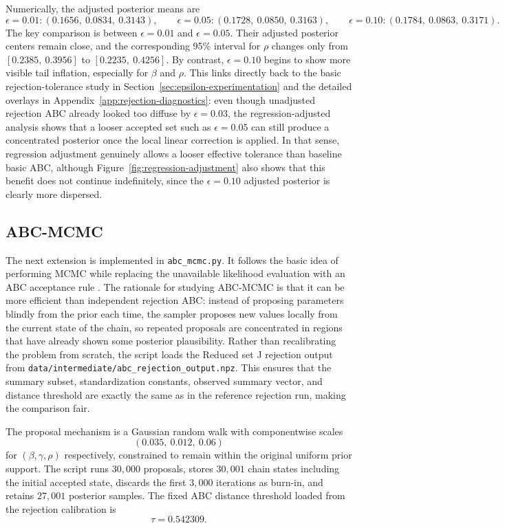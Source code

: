 \documentclass[11pt]{article}
\begin{document}
Numerically, the adjusted posterior means are
\[
\epsilon=0.01: (0.1656,\ 0.0834,\ 0.3143), \qquad
\epsilon=0.05: (0.1728,\ 0.0850,\ 0.3163), \qquad
\epsilon=0.10: (0.1784,\ 0.0863,\ 0.3171).
\]
The key comparison is between $\epsilon=0.01$ and $\epsilon=0.05$. Their adjusted posterior centers remain close, and the corresponding 95\% interval for $\rho$ changes only from $[0.2385,\ 0.3956]$ to $[0.2235,\ 0.4256]$. By contrast, $\epsilon=0.10$ begins to show more visible tail inflation, especially for $\beta$ and $\rho$. This links directly back to the basic rejection-tolerance study in Section~\ref{sec:epsilon-experimentation} and the detailed overlays in Appendix~\ref{app:rejection-diagnostics}: even though unadjusted rejection ABC already looked too diffuse by $\epsilon=0.03$, the regression-adjusted analysis shows that a looser accepted set such as $\epsilon=0.05$ can still produce a concentrated posterior once the local linear correction is applied. In that sense, regression adjustment genuinely allows a looser effective tolerance than baseline basic ABC, although Figure~\ref{fig:regression-adjustment} also shows that this benefit does not continue indefinitely, since the $\epsilon=0.10$ adjusted posterior is clearly more dispersed.

\subsection{ABC-MCMC}

The next extension is implemented in \texttt{abc\_mcmc.py}. It follows the basic idea of performing MCMC while replacing the unavailable likelihood evaluation with an ABC acceptance rule \citep{marjoram2003}. The rationale for studying ABC-MCMC is that it can be more efficient than independent rejection ABC: instead of proposing parameters blindly from the prior each time, the sampler proposes new values locally from the current state of the chain, so repeated proposals are concentrated in regions that have already shown some posterior plausibility. Rather than recalibrating the problem from scratch, the script loads the Reduced set J rejection output from \texttt{data/intermediate/abc\_rejection\_output.npz}. This ensures that the summary subset, standardization constants, observed summary vector, and distance threshold are exactly the same as in the reference rejection run, making the comparison fair.

The proposal mechanism is a Gaussian random walk with componentwise scales
\[
(0.035,\ 0.012,\ 0.06)
\]
for $(\beta,\gamma,\rho)$ respectively, constrained to remain within the original uniform prior support. The script runs $30{,}000$ proposals, stores $30{,}001$ chain states including the initial accepted state, discards the first $3{,}000$ iterations as burn-in, and retains $27{,}001$ posterior samples. The fixed ABC distance threshold loaded from the rejection calibration is
\[
\tau = 0.542309.
\]
\end{document}
